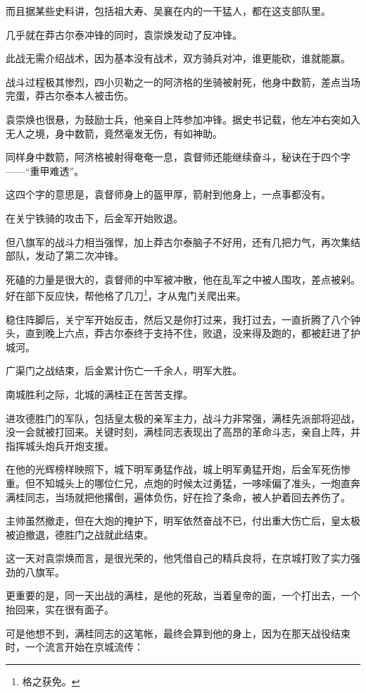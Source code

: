 \begin{multicols}{\theparacolNo}
		而且据某些史料讲，包括祖大寿、吴襄在内的一干猛人，都在这支部队里。

		几乎就在莽古尔泰冲锋的同时，袁崇焕发动了反冲锋。

		此战无需介绍战术，因为基本没有战术，双方骑兵对冲，谁更能砍，谁就能赢。

		战斗过程极其惨烈，四小贝勒之一的阿济格的坐骑被射死，他身中数箭，差点当场完蛋，莽古尔泰本人被击伤。

		袁崇焕也很悬，为鼓励士兵，他亲自上阵参加冲锋。据史书记载，他左冲右突如入无人之境，身中数箭，竟然毫发无伤，有如神助。

		同样身中数箭，阿济格被射得奄奄一息，袁督师还能继续奋斗，秘诀在于四个字——“重甲难透”。

		这四个字的意思是，袁督师身上的盔甲厚，箭射到他身上，一点事都没有。

		在关宁铁骑的攻击下，后金军开始败退。

		但八旗军的战斗力相当强悍，加上莽古尔泰脑子不好用，还有几把力气，再次集结部队，发动了第二次冲锋。

		死磕的力量是很大的，袁督师的中军被冲散，他在乱军之中被人围攻，差点被剁。好在部下反应快，帮他格了几刀\footnote{格之获免。}，才从鬼门关爬出来。

		稳住阵脚后，关宁军开始反击，然后又是你打过来，我打过去，一直折腾了八个钟头，直到晚上六点，莽古尔泰终于支持不住，败退，没来得及跑的，都被赶进了护城河。

		广渠门之战结束，后金累计伤亡一千余人，明军大胜。

		南城胜利之际，北城的满桂正在苦苦支撑。

		进攻德胜门的军队，包括皇太极的亲军主力，战斗力非常强，满桂先派部将迎战，没一会就被打回来。关键时刻，满桂同志表现出了高昂的革命斗志，亲自上阵，并指挥城头炮兵开炮支援。

		在他的光辉榜样映照下，城下明军勇猛作战，城上明军勇猛开炮，后金军死伤惨重。但不知城头上的哪位仁兄，点炮的时候太过勇猛，一哆嗦偏了准头，一炮直奔满桂同志，当场就把他撂倒，遍体负伤，好在捡了条命，被人护着回去养伤了。

		主帅虽然撤走，但在大炮的掩护下，明军依然奋战不已，付出重大伤亡后，皇太极被迫撤退，德胜门之战就此结束。

		这一天对袁崇焕而言，是很光荣的，他凭借自己的精兵良将，在京城打败了实力强劲的八旗军。

		更重要的是，同一天出战的满桂，是他的死敌，当着皇帝的面，一个打出去，一个抬回来，实在很有面子。

		可是他想不到，满桂同志的这笔帐，最终会算到他的身上，因为在那天战役结束时，一个流言开始在京城流传：


\end{multicols}
